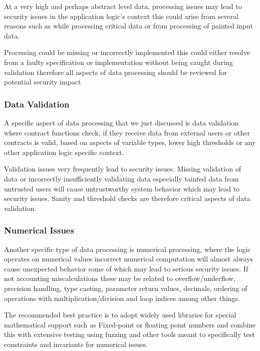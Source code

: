At a very high and perhaps abstract level data, processing issues may
lead to security issues in the application logic's context this could
arise from several reasons such as while processing critical data or
from processing of painted input data.

Processing could be missing or incorrectly implemented this could either
resolve from a faulty specification or implementation without being
caught during validation therefore all aspects of data processing should
be reviewed for potential security impact

\subsubsection{Data Validation}\label{data-validation}

A specific aspect of data processing that we just discussed is data
validation where contract functions check, if they receive data from
external users or other contracts is valid, based on aspects of variable
types, lower high thresholds or any other application logic specific
context.

Validation issues very frequently lead to security issues. Missing
validation of data or incorrectly insufficiently validating data
especially tainted data from untrusted users will cause untrustworthy
system behavior which may lead to security issues. Sanity and threshold
checks are therefore critical aspects of data validation.

\subsubsection{Numerical Issues}\label{numerical-issues}

Another specific type of data processing is numerical processing, where
the logic operates on numerical values incorrect numerical computation
will almost always cause unexpected behavior some of which may lead to
serious security issues. If not accounting miscalculations these may be
related to overflow/underflow, precision handling, type casting,
parameter return values, decimals, ordering of operations with
multiplication/division and loop indices among other things.

The recommended best practice is to adopt widely used libraries for
special mathematical support such as Fixed-point or floating point
numbers and combine this with extensive testing using fuzzing and other
tools meant to specifically test constraints and invariants for
numerical issues.

